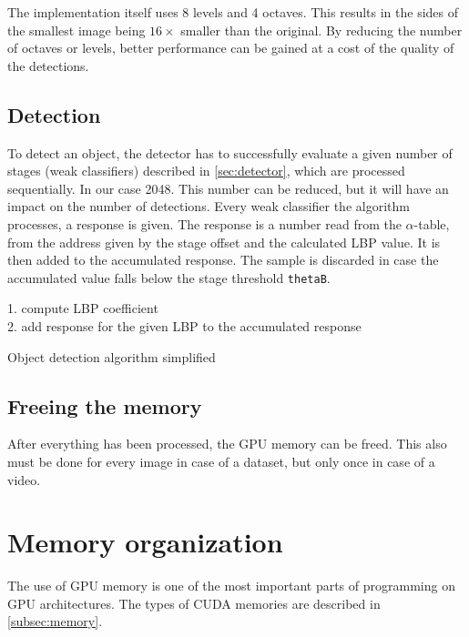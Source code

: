 The implementation itself uses 8 levels and 4 octaves. This results in the sides of the smallest image being $16 \times$ smaller than the original. By reducing the number of octaves or levels, better performance can be gained at a cost of the quality of the detections.

\subsection{Detection}

To detect an object, the detector has to successfully evaluate a given number of stages (weak classifiers) described in \ref{sec:detector}, which are processed sequentially. In our case 2048. This number can be reduced, but it will have an impact on the number of detections. Every weak classifier the algorithm processes, a response is given. The response is a number read from the $\alpha$-table, from the address given by the stage offset and the calculated LBP value. It is then added to the accumulated response. The sample is discarded in case the accumulated value falls below the stage threshold \verb|thetaB|.

\begin{algorithm} \label{alg:detection}
{
	{
		1. compute LBP coefficient \\
		2. add response for the given LBP to the accumulated response \\
	}
}

\caption{Object detection algorithm simplified}
\end{algorithm}

\subsection{Freeing the memory}\label{subsec:free}

After everything has been processed, the GPU memory can be freed. This also must be done for every image in case of a dataset, but only once in case of a video.

\section{Memory organization} \label{sec:memory-organization}

The use of GPU memory is one of the most important parts of programming on GPU architectures. The types of CUDA memories are described in \ref{subsec:memory}.

